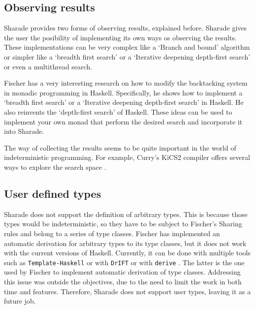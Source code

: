 \documentclass[class=article, crop=false]{standalone}
\begin{document}
\subsection{Observing results}

Sharade provides two forms of observing results, explained before. Sharade gives the user
the posibility of implementing its own ways os observing the results. These implementations
can be very complex like a `Branch and bound' algorithm or simpler like a `breadth first
search' or a `Iterative deepening depth-first search' or even a multithread search.

Fischer has a very interesting research \cite{fischer2009reinventing} on how to modify the
backtacking system in monadic programming in Haskell. Specifically, he shows how to implement
a `breadth first search' or a `Iterative deepening depth-first search' in Haskell. He also
reinvents the `depth-first search' of Haskell. These ideas can be used to implement your own
monad that perform the desired search and incorporate it into Sharade.

The way of collecting the results seems to be quite important in the world of indeterministic
programming. For example, Curry's KiCS2 compiler offers several ways to explore the search
space \cite{hanus2012search}.

\subsection{User defined types}

Sharade does not support the definition of arbitrary types. This is because those types would
be indeterministic, so they have to be subject to Fischer's Sharing rules and belong to a
series of type classes. Fischer has implemented an automatic derivation for arbitrary types
to its type classes, but it does not work with the current versions of Haskell. Currently, it
can be done with multiple tools such as
\verb`Template-Haskell` \cite{sheard2002template} or with
\verb`DrIFT` \cite{DrIFT} or with \verb`derive` \cite{derive}. The latter is the one used by
Fischer to implement automatic derivation of type classes. Addressing this issue was outside
the objectives, due to the need to limit the work in both time and features. Therefore,
Sharade does not support user types, leaving it as a future job.
\end{document}
